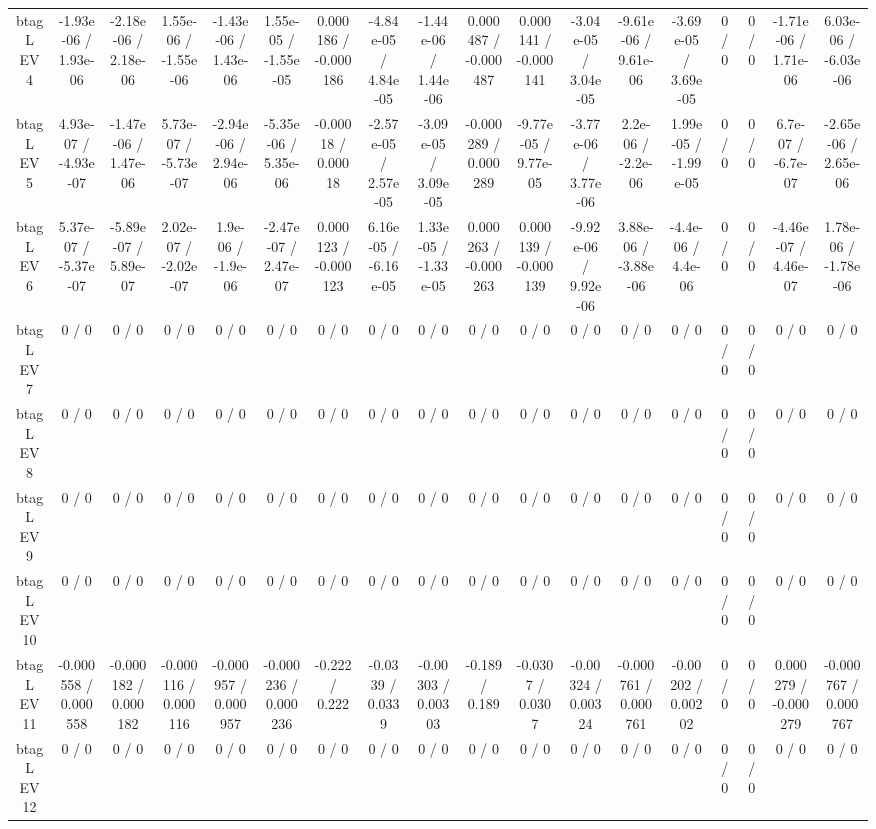 \documentclass[10pt]{article}
\begin{document}
\begin{table}[htbp]
\begin{center}
\begin{tabular}{|c|c|c|c|c|c|c|c|c|c|c|c|c|c|c|c|c|c|}
  btag L EV 4 & -1.93e-06 / 1.93e-06 & -2.18e-06 / 2.18e-06 & 1.55e-06 / -1.55e-06 & -1.43e-06 / 1.43e-06 & 1.55e-05 / -1.55e-05 & 0.000186 / -0.000186 & -4.84e-05 / 4.84e-05 & -1.44e-06 / 1.44e-06 & 0.000487 / -0.000487 & 0.000141 / -0.000141 & -3.04e-05 / 3.04e-05 & -9.61e-06 / 9.61e-06 & -3.69e-05 / 3.69e-05 & 0 / 0 & 0 / 0 & -1.71e-06 / 1.71e-06 & 6.03e-06 / -6.03e-06 \\ 
  btag L EV 5 & 4.93e-07 / -4.93e-07 & -1.47e-06 / 1.47e-06 & 5.73e-07 / -5.73e-07 & -2.94e-06 / 2.94e-06 & -5.35e-06 / 5.35e-06 & -0.00018 / 0.00018 & -2.57e-05 / 2.57e-05 & -3.09e-05 / 3.09e-05 & -0.000289 / 0.000289 & -9.77e-05 / 9.77e-05 & -3.77e-06 / 3.77e-06 & 2.2e-06 / -2.2e-06 & 1.99e-05 / -1.99e-05 & 0 / 0 & 0 / 0 & 6.7e-07 / -6.7e-07 & -2.65e-06 / 2.65e-06 \\ 
  btag L EV 6 & 5.37e-07 / -5.37e-07 & -5.89e-07 / 5.89e-07 & 2.02e-07 / -2.02e-07 & 1.9e-06 / -1.9e-06 & -2.47e-07 / 2.47e-07 & 0.000123 / -0.000123 & 6.16e-05 / -6.16e-05 & 1.33e-05 / -1.33e-05 & 0.000263 / -0.000263 & 0.000139 / -0.000139 & -9.92e-06 / 9.92e-06 & 3.88e-06 / -3.88e-06 & -4.4e-06 / 4.4e-06 & 0 / 0 & 0 / 0 & -4.46e-07 / 4.46e-07 & 1.78e-06 / -1.78e-06 \\ 
  btag L EV 7 & 0 / 0 & 0 / 0 & 0 / 0 & 0 / 0 & 0 / 0 & 0 / 0 & 0 / 0 & 0 / 0 & 0 / 0 & 0 / 0 & 0 / 0 & 0 / 0 & 0 / 0 & 0 / 0 & 0 / 0 & 0 / 0 & 0 / 0 \\ 
  btag L EV 8 & 0 / 0 & 0 / 0 & 0 / 0 & 0 / 0 & 0 / 0 & 0 / 0 & 0 / 0 & 0 / 0 & 0 / 0 & 0 / 0 & 0 / 0 & 0 / 0 & 0 / 0 & 0 / 0 & 0 / 0 & 0 / 0 & 0 / 0 \\ 
  btag L EV 9 & 0 / 0 & 0 / 0 & 0 / 0 & 0 / 0 & 0 / 0 & 0 / 0 & 0 / 0 & 0 / 0 & 0 / 0 & 0 / 0 & 0 / 0 & 0 / 0 & 0 / 0 & 0 / 0 & 0 / 0 & 0 / 0 & 0 / 0 \\ 
  btag L EV 10 & 0 / 0 & 0 / 0 & 0 / 0 & 0 / 0 & 0 / 0 & 0 / 0 & 0 / 0 & 0 / 0 & 0 / 0 & 0 / 0 & 0 / 0 & 0 / 0 & 0 / 0 & 0 / 0 & 0 / 0 & 0 / 0 & 0 / 0 \\ 
  btag L EV 11 & -0.000558 / 0.000558 & -0.000182 / 0.000182 & -0.000116 / 0.000116 & -0.000957 / 0.000957 & -0.000236 / 0.000236 & -0.222 / 0.222 & -0.0339 / 0.0339 & -0.00303 / 0.00303 & -0.189 / 0.189 & -0.0307 / 0.0307 & -0.00324 / 0.00324 & -0.000761 / 0.000761 & -0.00202 / 0.00202 & 0 / 0 & 0 / 0 & 0.000279 / -0.000279 & -0.000767 / 0.000767 \\ 
  btag L EV 12 & 0 / 0 & 0 / 0 & 0 / 0 & 0 / 0 & 0 / 0 & 0 / 0 & 0 / 0 & 0 / 0 & 0 / 0 & 0 / 0 & 0 / 0 & 0 / 0 & 0 / 0 & 0 / 0 & 0 / 0 & 0 / 0 & 0 / 0 \\ 

\end{tabular}
\end{center}
\end{table}
\end{document}
